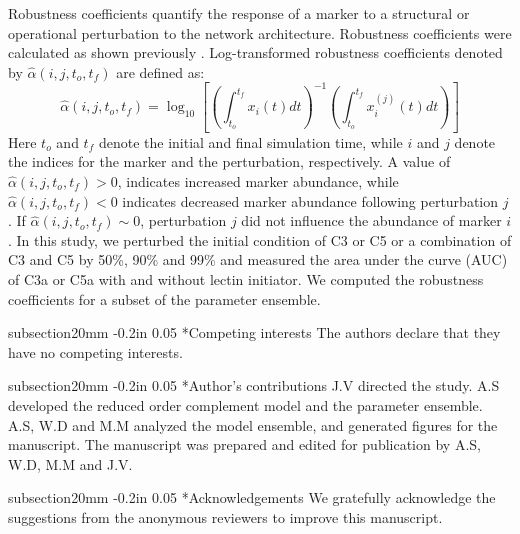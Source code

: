 \documentclass[12pt]{article}
\makeatletter
\renewcommand\section{\@startsection
	{subsection}{2}{0mm}
	{-0.2in}
	{0.05\baselineskip}
	{\normalfont\large\bfseries}}
\makeatother
\begin{document}
Robustness coefficients quantify the response of a marker to a structural or operational perturbation to the network architecture.
Robustness coefficients were calculated as shown previously \cite{Tasseff:2011aa}.
Log-transformed robustness coefficients denoted by $\hat{\alpha}\left(i,j,t_{o},t_{f}\right)$ are defined as:
\begin{equation}
\hat{\alpha}\left(i,j,t_{o},t_{f}\right)=\log_{10}\left[\left(\displaystyle\int_{t_{o}}^{t_{f}}x_{i}\left(t\right)dt\right)^{-1}\left(\displaystyle\int_{t_{o}}^{t_{f}}x^{(j)}_{i}\left(t\right)dt\right)\right]
\end{equation}
Here $t_o$ and $t_f$ denote the initial and final simulation time, while $i$ and $j$ denote the indices for the marker and the perturbation, respectively.
A value of $\hat{\alpha}\left(i,j,t_{o},t_{f}\right)>0$, indicates increased marker abundance, while $\hat{\alpha}\left(i,j,t_{o},t_{f}\right)<0$ indicates decreased marker abundance following perturbation $j$.
If $\hat{\alpha}\left(i,j,t_{o},t_{f}\right)\sim{0}$, perturbation $j$ did not influence the abundance of marker $i$.
In this study, we perturbed the initial condition of C3 or C5 or a combination of C3 and C5 by 50\%, 90\% and 99\% and measured the area under the curve (AUC)
of C3a or C5a with and without lectin initiator. We computed the robustness coefficients for a subset of the parameter ensemble.


\clearpage

\section*{Competing interests}
The authors declare that they have no competing interests.

\section*{Author's contributions}
J.V directed the study. A.S developed the reduced order complement model and the parameter ensemble.
A.S, W.D and M.M analyzed the model ensemble, and generated figures for the manuscript.
The manuscript was prepared and edited for publication by A.S, W.D, M.M and J.V.

\section*{Acknowledgements}
We gratefully acknowledge the suggestions from the anonymous reviewers to improve this manuscript.
\end{document}
